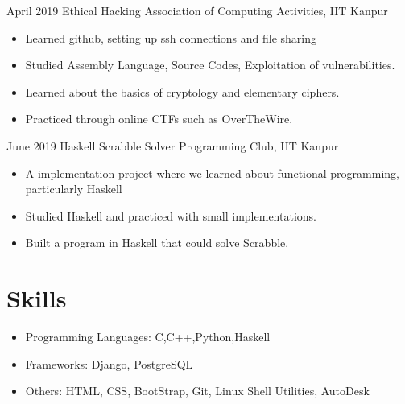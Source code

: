 \documentclass[]{style}          %
\begin{document}
\begin{entrylist}
\entry
{April 2019}
{Ethical Hacking}
{Association of Computing Activities, IIT Kanpur}
{\begin{itemize}
    \item Learned github, setting up ssh connections and file sharing
    \item Studied Assembly Language, Source Codes, Exploitation of vulnerabilities.
    \item Learned about the basics of cryptology and elementary ciphers.
    \item Practiced through online CTFs such as OverTheWire.
\end{itemize}}
{\vspace{+0.3cm}}
\end{entrylist}
{\vspace{-0.6cm}}
\begin{entrylist}
\entry
{June 2019}
{Haskell Scrabble Solver}
{Programming Club, IIT Kanpur}
{\begin{itemize}
    \item A implementation project where we learned about functional programming, particularly Haskell
    \item Studied Haskell and practiced with small implementations.
    \item Built a program in Haskell that could solve Scrabble.
\end{itemize}}
{\vspace{-0.3cm}}

\end{entrylist}






\section{Skills}
  \vspace{-0.3cm}
\begin{entrylist}
\entry
{}
{\begin{itemize}
    \item Programming Languages: {\normalfont C,C++,Python,Haskell}
    \item Frameworks:            {\normalfont Django, PostgreSQL}
    \item Others:                {\normalfont HTML, CSS, BootStrap, Git, Linux Shell Utilities, AutoDesk}
\end{itemize}}
{}
{}

\end{entrylist}\

\end{document}

